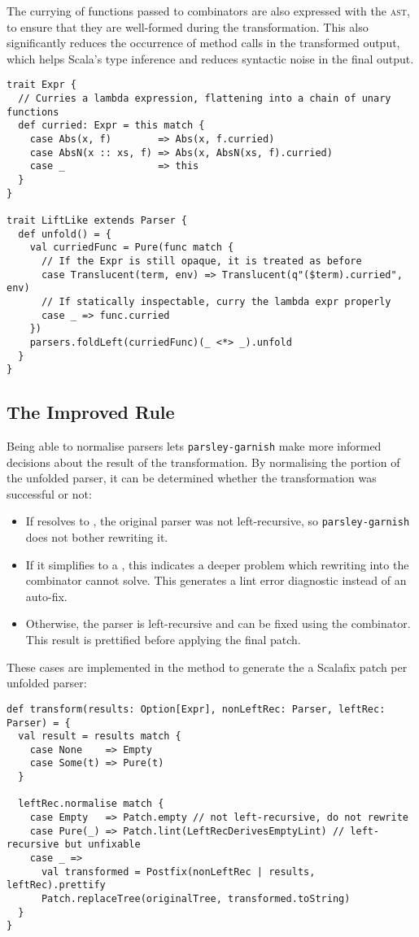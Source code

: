 \documentclass[../../main.tex]{subfiles}
\begin{document}
The currying of functions passed to  combinators are also expressed with the  \textsc{ast}, to ensure that they are well-formed during the transformation.
This also significantly reduces the occurrence of  method calls in the transformed output, which helps Scala's type inference and reduces syntactic noise in the final output.
\begin{verbatim}
trait Expr {
  // Curries a lambda expression, flattening into a chain of unary functions
  def curried: Expr = this match {
    case Abs(x, f)        => Abs(x, f.curried)
    case AbsN(x :: xs, f) => Abs(x, AbsN(xs, f).curried)
    case _                => this
  }
}

trait LiftLike extends Parser {
  def unfold() = {
    val curriedFunc = Pure(func match {
      // If the Expr is still opaque, it is treated as before
      case Translucent(term, env) => Translucent(q"($term).curried", env)
      // If statically inspectable, curry the lambda expr properly
      case _ => func.curried
    })
    parsers.foldLeft(curriedFunc)(_ <*> _).unfold
  }
}
\end{verbatim}

\subsection{The Improved Rule}
Being able to normalise parsers lets \texttt{parsley-garnish} make more informed decisions about the result of the transformation.
By normalising the  portion of the unfolded parser, it can be determined whether the transformation was successful or not:
\begin{itemize}
  \item If  resolves to , the original parser was not left-recursive, so \texttt{parsley-garnish} does not bother rewriting it.
  \item If it simplifies to a , this indicates a deeper problem which rewriting into the  combinator cannot solve. This generates a lint error diagnostic instead of an auto-fix.
  \item Otherwise, the parser is left-recursive and can be fixed using the  combinator. This result is prettified before applying the final patch.
\end{itemize}
%
These cases are implemented in the  method to generate the a Scalafix patch per unfolded parser:
\begin{verbatim}
def transform(results: Option[Expr], nonLeftRec: Parser, leftRec: Parser) = {
  val result = results match {
    case None    => Empty
    case Some(t) => Pure(t)
  }

  leftRec.normalise match {
    case Empty   => Patch.empty // not left-recursive, do not rewrite
    case Pure(_) => Patch.lint(LeftRecDerivesEmptyLint) // left-recursive but unfixable
    case _ =>
      val transformed = Postfix(nonLeftRec | results, leftRec).prettify
      Patch.replaceTree(originalTree, transformed.toString)
  }
}
\end{verbatim}
\end{document}
